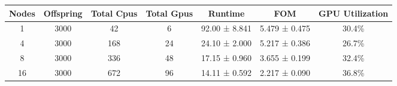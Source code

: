 \begin{tabular}{|c|c|c|c|c|c|c|}
\toprule
 Nodes &  Offspring &  Total Cpus &  Total Gpus &       Runtime &           FOM & GPU Utilization \\
\midrule
     1 &       3000 &          42 &           6 & 92.00 ± 8.841 & 5.479 ± 0.475 &           30.4\% \\
     4 &       3000 &         168 &          24 & 24.10 ± 2.000 & 5.217 ± 0.386 &           26.7\% \\
     8 &       3000 &         336 &          48 & 17.15 ± 0.960 & 3.655 ± 0.199 &           32.4\% \\
    16 &       3000 &         672 &          96 & 14.11 ± 0.592 & 2.217 ± 0.090 &           36.8\% \\
\bottomrule
\end{tabular}
